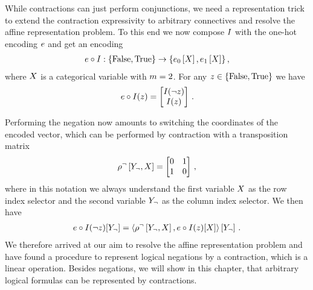 
While contractions can just perform conjunctions, we need a representation trick to extend the contraction expressivity to arbitrary connectives and resolve the affine representation problem.
To this end we now compose $I$ with the one-hot encoding $e$ and get an encoding
\begin{align*}
	e\circ I : \{\mathrm{False},\mathrm{True}\} \rightarrow \{e_0\left[X\right],e_1\left[X\right]\} \, ,
\end{align*}
where $X$ is a categorical variable with $m=2$.
For any $z\in\{\mathrm{False},\mathrm{True}\}$ we have
\begin{align*}
	e\circ I(z) = 
	\begin{bmatrix}
		I(\lnot z) \\
		I(z)
	\end{bmatrix}  \, .
\end{align*}


Performing the negation now amounts to switching the coordinates of the encoded vector, which can be performed by contraction with a transposition matrix
\begin{align*}
	\rho^{\lnot}\left[Y_{\lnot},X\right] = 
	\begin{bmatrix}
		0 & 1 \\
		1 & 0
	\end{bmatrix} \, ,
\end{align*}
where in this notation we always understand the first variable $X$ as the row index selector and the second variable $Y_{\lnot}$ as the column index selector.
We then have
\begin{align*}
	e\circ I(\lnot z)[Y_{\lnot}] 
	= \left\langle \rho^{\lnot}\left[Y_{\lnot},X\right],e\circ I(z)[X]\right\rangle \left[ Y_{\lnot} \right] \, .  
\end{align*}
We therefore arrived at our aim to resolve the affine representation problem and have found a procedure to represent logical negations by a contraction, which is a linear operation.
Besides negations, we will show in this chapter, that arbitrary logical formulas can be represented by contractions.

